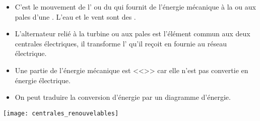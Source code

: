\begin{mybilan}
	\begin{itemize}
		\item C'est le mouvement de l' ou du  qui fournit de l'énergie mécanique à la  ou aux pales d'une . L'eau et le vent sont des .
		\item L'alternateur relié à la turbine ou aux pales est l'élément commun aux deux centrales électriques, il transforme l' qu'il reçoit en  fournie au réseau électrique.
		\item Une partie de l'énergie mécanique est <<>> car elle n'est pas convertie en énergie électrique.
		\item On peut traduire la conversion d'énergie par un diagramme d'énergie.
	\end{itemize}

	\begin{center}
		\texttt{[image: centrales\_renouvelables]}
	\end{center}
\end{mybilan}
